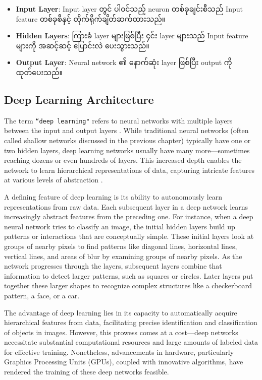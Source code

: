 \begin{itemize}
  \item \textbf{Input Layer}: Input layer တွင် ပါ၀င်သည့်  neuron တစ်ခုချင်းစီသည် Input feature တစ်ခုစီနှင့် တိုက်ရိုက်ချိတ်ဆက်ထားသည်။ 
  \item \textbf{Hidden Layers}: ကြားခံ layer များဖြစ်ပြီး ၄င်း layer များသည် Input feature များကို အဆင့်ဆင့် ပြောင်းလဲ ပေးသွားသည်။ 
  \item \textbf{Output Layer}: Neural network ၏ နောက်ဆုံး layer ဖြစ်ပြီး output ကို ထုတ်ပေးသည်။ 
\end{itemize}

\subsection{Deep Learning Architecture}\label{deepNN}

The term \texttt{``deep learning"} refers to neural networks with multiple layers between the input and output layers \cite{Goodfellow-et-al-2016}. While traditional neural networks (often called shallow networks discussed in the previous chapter) typically have one or two hidden layers, deep learning networks usually have many more—sometimes reaching dozens or even hundreds of layers. This increased depth enables the network to learn hierarchical representations of data, capturing intricate features at various levels of abstraction \cite{lecun2015deep}.

A defining feature of deep learning is its ability to autonomously learn representations from raw data. Each subsequent layer in a deep network learns increasingly abstract features from the preceding one. For instance, when a deep neural network tries to classify an image, the initial hidden layers build up patterns or interactions that are conceptually simple. These initial layers look at groups of nearby pixels to find patterns like diagonal lines, horizontal lines, vertical lines, and areas of blur by examining groups of nearby pixels. As the network progresses through the layers, subsequent layers combine that information to detect larger patterns, such as squares or circles. Later layers put together these larger shapes to recognize complex structures like a checkerboard pattern, a face, or a car. 

The advantage of deep learning lies in its capacity to automatically acquire hierarchical features from data, facilitating precise identification and classification of objects in images. However, this prowess comes at a cost—deep networks necessitate substantial computational resources and large amounts of labeled data for effective training. Nonetheless, advancements in hardware, particularly Graphics Processing Units (GPUs), coupled with innovative algorithms, have rendered the training of these deep networks feasible.

